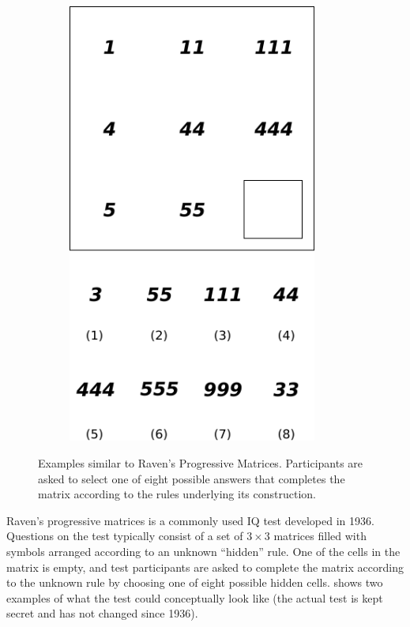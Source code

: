 \documentclass[10pt,letterpaper,oneside]{article}
\begin{document}
\begin{figure}[t]
\begin{subfigure}{0.33\textwidth}
		\includegraphics[width=0.9\textwidth]{media/ravens_example_c.pdf}%
		\caption{}%
		\label{fig:ravens_example_c}%
	\end{subfigure}
	\caption{Examples similar to Raven's Progressive Matrices. Participants are asked to select one of eight possible answers that completes the matrix according to the rules underlying its construction.}
	\label{fig:ravens_example}
\end{figure}

Raven's progressive matrices is a commonly used IQ test developed in 1936. Questions on the test typically consist of a set of $3 \times 3$ matrices filled with symbols arranged according to an unknown \enquote{hidden} rule. One of the cells in the matrix is empty, and test participants are asked to complete the matrix according to the unknown rule by choosing one of eight possible hidden cells.  shows two examples of what the test could conceptually look like (the actual test is kept secret and has not changed since 1936).
\end{document}
